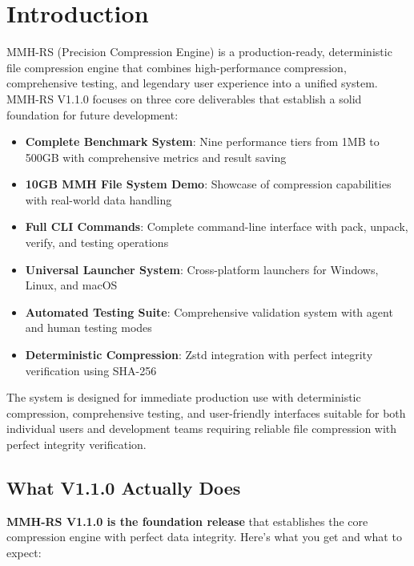 \documentclass[11pt,a4paper]{article}
\begin{document}
	\section{Introduction}
	\label{sec:intro}
	
	MMH-RS (Precision Compression Engine) is a production-ready, deterministic file compression engine that combines high-performance compression, comprehensive testing, and legendary user experience into a unified system. MMH-RS V1.1.0 focuses on three core deliverables that establish a solid foundation for future development:
	
	\begin{itemize}
		\item \textbf{Complete Benchmark System}: Nine performance tiers from 1MB to 500GB with comprehensive metrics and result saving
		\item \textbf{10GB MMH File System Demo}: Showcase of compression capabilities with real-world data handling
		\item \textbf{Full CLI Commands}: Complete command-line interface with pack, unpack, verify, and testing operations
		\item \textbf{Universal Launcher System}: Cross-platform launchers for Windows, Linux, and macOS
		\item \textbf{Automated Testing Suite}: Comprehensive validation system with agent and human testing modes
		\item \textbf{Deterministic Compression}: Zstd integration with perfect integrity verification using SHA-256
	\end{itemize}
	
	The system is designed for immediate production use with deterministic compression, comprehensive testing, and user-friendly interfaces suitable for both individual users and development teams requiring reliable file compression with perfect integrity verification.
	
	\subsection{What V1.1.0 Actually Does}
	
	\textbf{MMH-RS V1.1.0 is the foundation release} that establishes the core compression engine with perfect data integrity. Here's what you get and what to expect:
	
\end{document}
